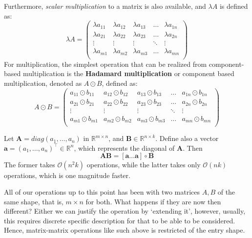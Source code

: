 Furthermore, \textit{scalar multiplication} to a matrix is also available, and $\lambda A$ is defined as: 
\begin{equation}
    \lambda A = \begin{pmatrix}
            \lambda a_{11} & \lambda a_{12} & \lambda a_{13} & \dots & \lambda a_{1n}\\
            \lambda a_{21} & \lambda a_{22} & \lambda a_{23} & \dots & \lambda a_{2n}\\
            \vdots & \vdots & \vdots & \ddots & \vdots \\
            \lambda a_{m1} & \lambda a_{m2} & \lambda a_{m3} & \dots & \lambda a_{mn}\\
        \end{pmatrix}
\end{equation}
For multiplication, the simplest operation that can be realized from component-based multiplication is the \textbf{Hadamard multiplication} or component based multiplication, denoted as $A\odot B$, defined as: 
\begin{equation}
    A\odot B = \begin{pmatrix}
            a_{11} \odot b_{11} & a_{12} \odot b_{12} & a_{13} \odot b_{13}& \dots & a_{1n}\odot b_{1n}\\
            a_{21} \odot b_{21} & a_{22} \odot b_{22} & a_{23} \odot b_{23}& \dots & a_{2n}\odot b_{2n}\\
            \vdots & \vdots & \vdots & \ddots & \vdots \\
            a_{m1} \odot b_{m1} & a_{m2} \odot b_{m2} & a_{m3} \odot b_{m3}& \dots & a_{mn}\odot b_{mn}\\
        \end{pmatrix}
\end{equation} 
\begin{remark}
    Let $\mathbf{A}=diag(a_{1},\dots,a_{n})$ in $\mathbb{R}^{m\times n}$, and $\mathbf{B}\in\mathbb{R}^{n\times k}$. Define also a vector $\mathbf{a}=(a_{1},\dots,a_{n})^{\top}\in\mathbb{R}^{n}$, which represents the diagonal of $\mathbf{A}$. Then $$\mathbf{AB}=[\mathbf{a}\dots \mathbf{a}]\circ \mathbf{B}$$
The former takes $\mathcal{O}(n^{2}k)$ operations, while the latter takes only $\mathcal{O}(nk)$ operations, which is one magnitude faster. 
\end{remark}
All of our operations up to this point has been with two matrices $A,B$ of the same shape, that is, $m\times n$ for both. What happens if they are now then different? Either we can justify the operation by `extending it', however, usually, this requires discrete specific description for that to be able to be considered. Hence, matrix-matrix operations like such above is restricted of the entry shape. 


